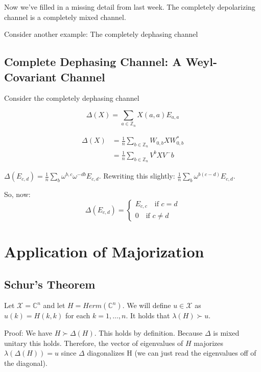 \documentclass{article}
\begin{document}
        Now we've filled in a missing detail from last week. The completely
        depolarizing channel is a completely mixed channel.
        
        Consider another example: The completely dephasing channel

        \subsection*{Complete Dephasing Channel: A Weyl-Covariant
        Channel}

        Consider the completely dephasing channel

        \[ 
                \Delta(X) =\sum_{a \in \mathbb{Z}_n} X(a,a) E_{a,a}
        \]
        
        \begin{align*}
            \Delta(X) &= \frac{1}{n} \sum_{b \in \mathbb{Z}_n} W_{0,b} X
            W_{0,b}^* \\
            &= \frac{1}{n} \sum_{b \in\mathbb{Z}_n} V^b X V^-b
        \end{align*}
        
        $\Delta(E_{c,d}) = \frac{1}{n} \sum\limits_{b} \omega^{b,c}
        \omega^{-db} E_{c,d}$. Rewriting this slightly: $ \frac{1}{n}
        \sum\limits_b \omega^{b(c-d)} E_{c,d}$.

        So, now:
        \[ 
            \Delta(E_{c,d}) = \begin{cases} E_{c,c} \quad \text{if $c=d$} \\ 0
                \quad \text{if $c \ne d$}\end{cases} 
        \]
        
        \section*{Application of Majorization}

        \subsection*{Schur's Theorem}

        Let $\mathcal{X} = \mathbb{C}^n$ and let $H = Herm(\mathbb{C}^n)$. We
        will define $u \in \mathcal{X}$ as $u(k) = H(k,k)$ for each $k =
        1,\ldots,n$. It holds that $\lambda(H) \succ u$.

        Proof: We have $H \succ \Delta(H)$. This holds by definition. Because
        $\Delta$ is mixed unitary this holds. Therefore, the vector of
        eigenvalues of $H$ majorizes $\lambda(\Delta(H)) = u$ since $\Delta$
        diagonalizes H (we can just read the eigenvalues off of the diagonal).
\end{document}
